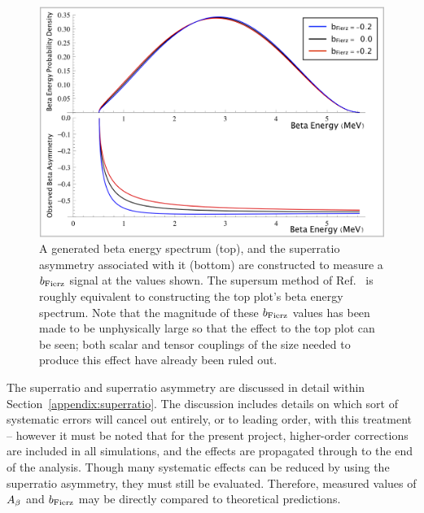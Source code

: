 \begin{figure}[h!!tb]
	\centering
	\includegraphics[width=.999\linewidth]
	{Figures/Fierz_Signature.png}
	\caption[Generated Beta Energy Spectrum and Superratio Asymmetry to Measure $\bFierz$]{A generated beta energy spectrum (top), and the superratio asymmetry associated with it (bottom) are constructed to measure a $\bFierz$ signal at the values shown.  The supersum method of Ref.~\cite{UCNA_first_Fierz} is roughly equivalent to constructing the top plot's beta energy spectrum.  Note that the magnitude of these $\bFierz$ values has been made to be unphysically large so that the effect to the top plot can be seen; both scalar and tensor couplings of the size needed to produce this effect have already been ruled out. }	\label{fig:FierzSignature}
\end{figure}

The superratio and superratio asymmetry are discussed in detail within Section~\ref{appendix:superratio}.  The discussion includes details on which sort of systematic errors will cancel out entirely, or to leading order, with this treatment -- however it must be noted that for the present project, higher-order corrections are included in all simulations, and the effects are propagated through to the end of the analysis.  Though many systematic effects can be reduced by using the superratio asymmetry, they must still be evaluated.  Therefore, measured values of $A_{\beta}$ and $\bFierz$ may be directly compared to theoretical predictions.



\note{}


